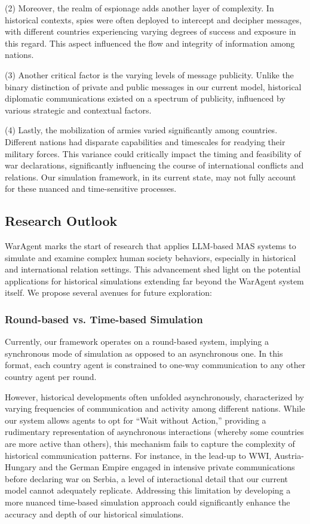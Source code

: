 \documentclass{article}
\begin{document}
(2) Moreover, the realm of espionage adds another layer of complexity. In historical contexts, spies were often deployed to intercept and decipher messages, with different countries experiencing varying degrees of success and exposure in this regard. This aspect influenced the flow and integrity of information among nations.

(3) Another critical factor is the varying levels of message publicity. Unlike the binary distinction of private and public messages in our current model, historical diplomatic communications existed on a spectrum of publicity, influenced by various strategic and contextual factors.

(4) Lastly, the mobilization of armies varied significantly among countries. Different nations had disparate capabilities and timescales for readying their military forces. This variance could critically impact the timing and feasibility of war declarations, significantly influencing the course of international conflicts and relations. Our simulation framework, in its current state, may not fully account for these nuanced and time-sensitive processes.

\subsection{Research Outlook}
WarAgent marks the start of research that applies LLM-based MAS systems to simulate and examine complex human society behaviors, especially in historical and international relation settings. This advancement shed light on the potential applications for historical simulations extending far beyond the WarAgent system itself. We propose several avenues for future exploration:

\subsubsection{Round-based vs. Time-based Simulation}
Currently, our framework operates on a round-based system, implying a synchronous mode of simulation as opposed to an asynchronous one. In this format, each country agent is constrained to one-way communication to any other country agent per round. 

However, historical developments often unfolded asynchronously, characterized by varying frequencies of communication and activity among different nations. While our system allows agents to opt for ``Wait without Action,'' providing a rudimentary representation of asynchronous interactions (whereby some countries are more active than others), this mechanism fails to capture the complexity of historical communication patterns. For instance, in the lead-up to WWI, Austria-Hungary and the German Empire engaged in intensive private communications before declaring war on Serbia, a level of interactional detail that our current model cannot adequately replicate. Addressing this limitation by developing a more nuanced time-based simulation approach could significantly enhance the accuracy and depth of our historical simulations.
\end{document}
